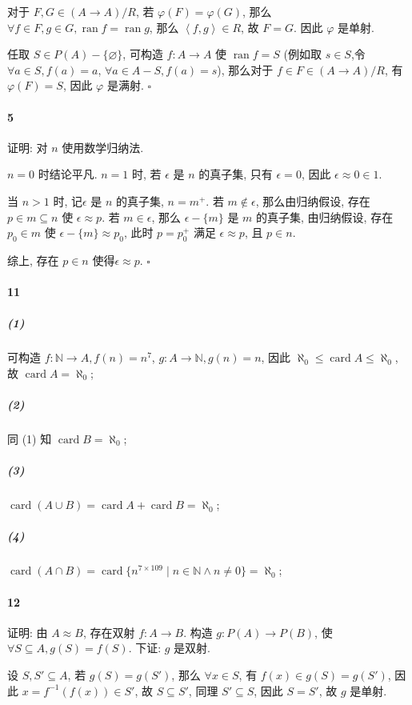 \documentclass{ctexart}
\def\QED{\hfill $\square$}
\def\pair#1{\left\langle #1 \right\rangle}
\def\conj{\mathrel{\wedge}}
\DeclareMathOperator{\ran}{ran}
\DeclareMathOperator{\card}{card}
\begin{document}
对于 $F, G\in (A\mathop{\to} A)/R$, 若 $\varphi(F)=\varphi(G)$, 
那么 $\forall f\in F, g\in G, \ran f = \ran g$, 那么 $\pair{f,g} \in R$,
故 $F=G$. 因此 $\varphi$ 是单射.

任取 $S \in P(A)-\{\varnothing\}$, 可构造 $f:A\to A$ 使 $\ran f=S$
(例如取 $s\in S$,令 $\forall a\in S, f(a)=a$,
$\forall a \in A-S, f(a)=s$), 那么对于 $f\in F\in (A\mathop{\to} A)/R$,
有 $\varphi(F)=S$, 因此 $\varphi$ 是满射. \QED

\paragraph*{5} 证明: 对 $n$ 使用数学归纳法.

$n=0$ 时结论平凡. $n=1$ 时, 若 $\epsilon$ 是 $n$ 的真子集, 只有 $\epsilon=0$, 
因此 $\epsilon \approx 0 \in 1$.

当 $n>1$ 时, 记$\epsilon$ 是 $n$ 的真子集, $n=m^+$. 若 $m\notin \epsilon$, 
那么由归纳假设, 存在 $p\in m\subseteq n$ 使 $\epsilon \approx p$.
若 $m\in \epsilon$, 那么 $\epsilon-\{m\}$ 是 $m$ 的真子集,
由归纳假设, 存在 $p_0\in m$ 使 $\epsilon-\{m\} \approx p_0$,
此时 $p=p_0^+$ 满足 $\epsilon \approx p$, 且 $p\in n$.

综上, 存在 $p\in n$ 使得$\epsilon \approx p$. \QED

\paragraph*{11} 

\subparagraph*{(1)} 可构造 $f:\mathbb{N}\to A, f(n)=n^7$,
$g:A\to\mathbb{N}, g(n)=n$, 因此 $\aleph_0 \le \card A \le \aleph_0$,
故 $\card A = \aleph_0$;

\subparagraph*{(2)} 同 (1) 知 $\card B = \aleph_0$;

\subparagraph*{(3)} $\card(A\cup B)=\card A + \card B = \aleph_0$;

\subparagraph*{(4)} $\card(A\cap B)=\card \{n^{7\times 109}\mid n\in \mathbb{N} \conj n\ne 0\} = \aleph_0$;

\paragraph*{12} 证明: 由 $A\approx B$, 存在双射 $f: A\to B$. 
构造 $g: P(A) \to P(B)$, 使 $\forall S \subseteq A, g(S)=f(S)$.
下证: $g$ 是双射.

设 $S,S'\subseteq A$, 若 $g(S)=g(S')$, 那么 $\forall x\in S$, 
有 $f(x)\in g(S) = g(S')$, 因此 $x = f^{-1}(f(x)) \in S'$,
故 $S\subseteq S'$, 同理 $S'\subseteq S$, 因此 $S=S'$, 故 $g$ 是单射.
\end{document}
